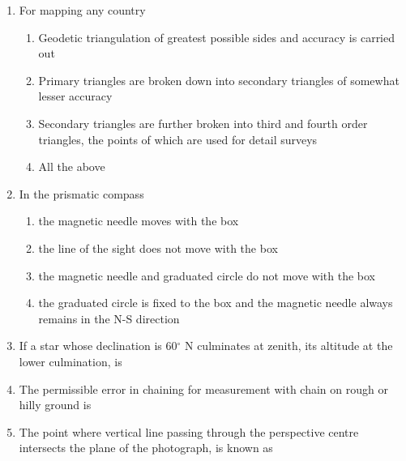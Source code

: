 \documentclass[11pt,a4paper]{article}
\begin{document}
\begin{enumerate}
\item{For mapping any country}
\begin{enumerate}[label=\Alph*.]
\item{Geodetic triangulation of greatest possible sides and accuracy is carried out}
\item{Primary triangles are broken down into secondary triangles of somewhat lesser accuracy}
\item{Secondary triangles are further broken into third and fourth order triangles, the points of which are used for detail surveys}
\item{All the above}
\end{enumerate}
\item{In the prismatic compass}
\begin{enumerate}[label=\Alph*.]
\item{the magnetic needle moves with the box}
\item{the line of the sight does not move with the box}
\item{the magnetic needle and graduated circle do not move with the box}
\item{the graduated circle is fixed to the box and the magnetic needle always remains in the N-S direction}
\end{enumerate}
\item{If a star whose declination is 60$^\circ$ N culminates at zenith, its altitude at the lower culmination, is
}
\\
\item{The permissible error in chaining for measurement with chain on rough or hilly ground is}
\\
\item{The point where vertical line passing through the perspective centre intersects the plane of the photograph, is known as}

\end{enumerate}
\end{document}
